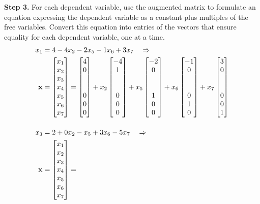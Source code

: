 \documentclass{ximera}
\begin{document}
\begin{example}
  \textbf{Step 3.}  For each dependent variable, use the augmented
  matrix to formulate an equation expressing the dependent variable as
  a constant plus multiples of the free variables.  Convert this
  equation into entries of the vectors that ensure equality for each
  dependent variable, one at a time.
  \begin{align*}
    x_1&=4-4x_2-2x_5-1x_6+3x_7\quad\Rightarrow\\
    \vect{x}&=\colvector{x_1\\x_2\\x_3\\x_4\\x_5\\x_6\\x_7}=
    \colvector{4\\0\\\ \\\ \\0\\0\\0}+
    x_2\colvector{-4\\1\\\ \\\ \\0\\0\\0}+
    x_5\colvector{-2\\0\\\ \\\ \\1\\0\\0}+
    x_6\colvector{-1\\0\\\ \\\ \\0\\1\\0}+
    x_7\colvector{3\\0\\\ \\\ \\0\\0\\1}\\[12pt]
    x_3&=2+0x_2-x_5+3x_6-5x_7\quad\Rightarrow\\
    \vect{x}&=\colvector{x_1\\x_2\\x_3\\x_4\\x_5\\x_6\\x_7}=

\end{align*}
\end{example}
\end{document}
